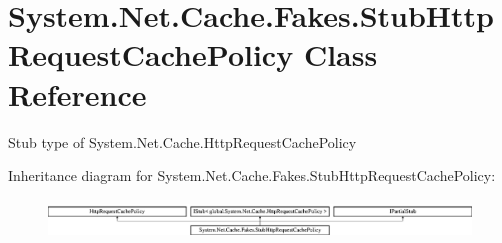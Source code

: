 \hypertarget{class_system_1_1_net_1_1_cache_1_1_fakes_1_1_stub_http_request_cache_policy}{\section{System.\-Net.\-Cache.\-Fakes.\-Stub\-Http\-Request\-Cache\-Policy Class Reference}
\label{class_system_1_1_net_1_1_cache_1_1_fakes_1_1_stub_http_request_cache_policy}
}


Stub type of System.\-Net.\-Cache.\-Http\-Request\-Cache\-Policy 


Inheritance diagram for System.\-Net.\-Cache.\-Fakes.\-Stub\-Http\-Request\-Cache\-Policy\-:\begin{figure}[H]
\begin{center}
\leavevmode
\includegraphics[height=1.048689cm]{class_system_1_1_net_1_1_cache_1_1_fakes_1_1_stub_http_request_cache_policy}
\end{center}
\end{figure}
